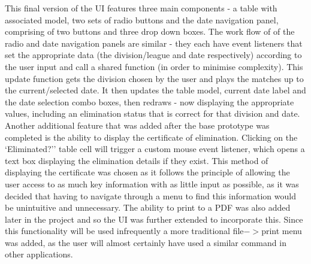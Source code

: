 This final version of the UI features three main components - a table with
associated model,  two sets of radio buttons and the date navigation panel,
comprising of two buttons and three drop down boxes. The work flow of of the
radio and date navigation panels are similar - they each have event listeners
that set the appropriate data (the division/league and date respectively)
according to the user input and call a shared function  (in order to minimise
complexity). This update function gets the division chosen by the user and plays
the matches up to the current/selected date. It then updates the table model,
current date label and the date selection combo boxes, then redraws - now
displaying the appropriate values, including an elimination status that is
correct for that division and date. Another additional feature that was added
after the base prototype was completed is the ability to display the certificate
of elimination. Clicking on the `Eliminated?'' table cell will trigger a custom
mouse event listener, which opens a  text box displaying the elimination details
if they exist. This method of displaying the certificate was chosen as it
follows the principle of allowing the user access to as much key information
with as little input as possible, as it was decided that having to navigate
through a menu to find this  information would be unintuitive and unnecessary.
The ability to print to a PDF was also added later in the project and so the UI
was further extended to incorporate this. Since this functionality will be used
infrequently a more traditional file$-$$>$print menu was added, as the user will
almost certainly have used a similar command in other applications.
